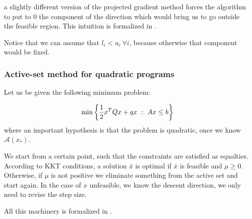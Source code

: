\documentclass[ComputationalMathematics.tex]{subfiles}
\begin{document}
a slightly different version of the projected gradient method forces the algorithm to put to $0$ the component of the direction which would bring us to go outside the feasible region. This intuition is formalized in .


Notice that we can assume that $l_i < u_i ~ \forall i$, because otherwise that component would be fixed.

\subsubsection{Active-set method for quadratic programs}\label{sec:12dic_active}

Let us be given the following minimum problem:

\[
  \min \bigg \{\frac{1}{2} {x}^{T} Q x + q x~:~Ax \leq b \bigg \}
\]
 where an important hypothesis is that the problem is quadratic, once we know $\mathcal{A}(x_*)$.

 We start from a certain point, such that the constraints are satisfied as equalties.
 According to KKT conditions, a solution $\bar{x}$ is optimal if $\bar{x}$ is feasible and $\mu \ge 0$.
 Otherwise, if $\mu$ is not positive we eliminate something from the active set and start again.
 In the case of $x$ unfeasible, we know the descent direction, we only need to revise the step size.

 All this machinery is formalized in .

\end{document}
